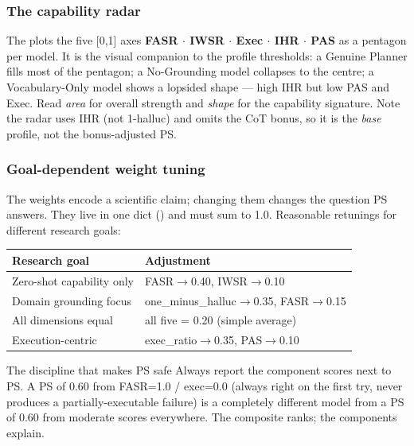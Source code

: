 \subsubsection{The capability radar}

The  plots the five [0,1] axes \textbf{FASR \(\cdot\) IWSR \(\cdot\) Exec \(\cdot\) IHR \(\cdot\) PAS} as a pentagon per model. It is the visual companion to the profile thresholds: a Genuine Planner fills most of the pentagon; a No-Grounding model collapses to the centre; a Vocabulary-Only model shows a lopsided shape --- high IHR but low PAS and Exec. Read \emph{area} for overall strength and \emph{shape} for the capability signature. Note the radar uses IHR (not 1-halluc) and omits the CoT bonus, so it is the \emph{base} profile, not the bonus-adjusted PS.



\subsubsection{Goal-dependent weight tuning}

The weights encode a scientific claim; changing them changes the question PS answers. They live in one dict () and must sum to 1.0. Reasonable retunings for different research goals:

\begin{table}[h]\small
\centering
\begin{tabularx}{\linewidth}{@{}l Y@{}}
\toprule
Research goal & Adjustment\\
\midrule
Zero-shot capability only & FASR\(\rightarrow\)0.40, IWSR\(\rightarrow\)0.10\\
\addlinespace
Domain grounding focus & one\_minus\_halluc\(\rightarrow\)0.35, FASR\(\rightarrow\)0.15\\
\addlinespace
All dimensions equal & all five = 0.20 (simple average)\\
\addlinespace
Execution-centric & exec\_ratio\(\rightarrow\)0.35, PAS\(\rightarrow\)0.10\\
\bottomrule
\end{tabularx}
\end{table}

\begin{bmkeybox}{The discipline that makes PS safe}
Always report the component scores next to PS. A PS of 0.60 from FASR=1.0 / exec=0.0 (always right on the first try, never produces a partially-executable failure) is a completely different model from a PS of 0.60 from moderate scores everywhere. The composite ranks; the components explain.
\end{bmkeybox}
